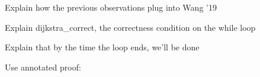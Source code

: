 
Explain how the previous observations plug into Wang '19

Explain dijkstra\_correct, the correctness condition on the while loop

Explain that by the time the loop ends, we'll be done

Use annotated proof:


